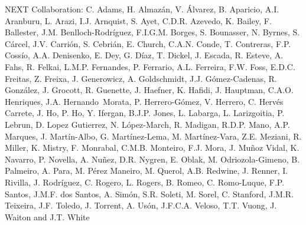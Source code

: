 NEXT Collaboration: C. Adams, H. Almaz\'an, V. \'Alvarez, B. Aparicio, A.I. Aranburu, L. Arazi, I.J. Arnquist, S. Ayet, C.D.R. Azevedo, K. Bailey, F. Ballester, J.M. Benlloch-Rodr\'{i}guez, F.I.G.M. Borges, S. Bounasser, N. Byrnes, S. C\'arcel, J.V. Carri\'on, S. Cebri\'an, E. Church, C.A.N. Conde, T. Contreras, F.P. Coss\'io, A.A. Denisenko, E. Dey, G. D\'iaz, T. Dickel, J. Escada, R. Esteve, A. Fahs, R. Felkai, L.M.P. Fernandes, P. Ferrario, A.L. Ferreira, F.W. Foss, E.D.C. Freitas, Z. Freixa, J. Generowicz, A. Goldschmidt, J.J. G\'omez-Cadenas, R. Gonz\'alez, J. Grocott, R. Guenette, J. Haefner, K. Hafidi, J. Hauptman, C.A.O. Henriques, J.A. Hernando~Morata, P. Herrero-G\'omez, V. Herrero, C. Herv\'es Carrete, J. Ho, P. Ho, Y. Ifergan, B.J.P. Jones, L. Labarga, L. Larizgoitia, P. Lebrun, D. Lopez Gutierrez, N. L\'opez-March, R. Madigan, R.D.P. Mano, A.P. Marques, J. Mart\'in-Albo, G. Mart\'inez-Lema, M. Mart\'inez-Vara, Z.E. Meziani, R. Miller, K. Mistry, F. Monrabal, C.M.B. Monteiro, F.J. Mora, J. Mu\~noz Vidal, K. Navarro, P. Novella, A. Nu\~{n}ez, D.R. Nygren, E. Oblak, M. Odriozola-Gimeno, B. Palmeiro, A. Para, M. P\'erez Maneiro, M. Querol, A.B. Redwine, J. Renner, I. Rivilla, J. Rodr\'iguez, C. Rogero, L. Rogers, B. Romeo, C. Romo-Luque, F.P. Santos, J.M.F. dos Santos, A. Sim\'on, S.R. Soleti, M. Sorel, C. Stanford, J.M.R. Teixeira, J.F. Toledo, J. Torrent, A. Us\'on, J.F.C.A. Veloso, T.T. Vuong, J. Waiton and J.T. White